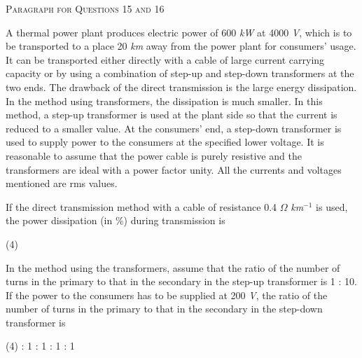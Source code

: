 
\begin{center}
    \textsc{Paragraph for Questions 15 and 16}
\end{center}

A thermal power plant produces electric power of 600 \emph{kW} at 4000 \emph{V}, which is to be transported to a place 20 \emph{km} away from the power plant for consumers' usage. It can be transported either directly with a cable of large current carrying capacity or by using a combination of step-up and step-down transformers at the two ends. The drawback of the direct transmission is the large energy dissipation. In the method using transformers, the dissipation is much smaller. In this method, a step-up transformer is used at the plant side so that the current is reduced to a smaller value. At the consumers' end, a step-down transformer is used to supply power to the consumers at the specified lower voltage. It is reasonable to assume that the power cable is purely resistive and the transformers are ideal with a power factor unity. All the currents and voltages mentioned are rms values.

\item If the direct transmission method with a cable of resistance 0.4 $\Omega$ \emph{km}$^{-1}$ is used, the power dissipation (in \%) during transmission is
    \begin{tasks}(4)
         \ans
    \end{tasks}

\item In the method using the transformers, assume that the ratio of the number of turns in the primary to that in the secondary in the step-up transformer is 1 : 10. If the power to the consumers has to be supplied at 200 \emph{V}, the ratio of the number of turns in the primary to that in the secondary in the step-down transformer is
    \begin{tasks}(4)
         : 1 \ans
         : 1
         : 1
         : 1
    \end{tasks}
